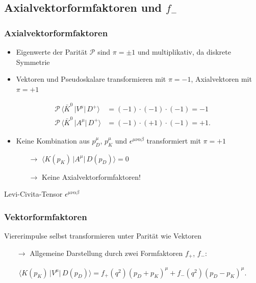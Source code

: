 \documentclass[hyperref={pdfpagelabels=false}]{beamer}
\begin{document}
\subsection{Axialvektorformfaktoren und $f_-$}
\begin{frame}
\frametitle{Axialvektorformfaktoren}
\begin{itemize}
 \item Eigenwerte der Parität $\mathcal{P}$ sind $\pi = \pm1$ und multiplikativ, da diskrete Symmetrie
 \item Vektoren und Pseudoskalare transformieren mit $\pi = -1$, Axialvektoren mit $\pi = +1$
\end{itemize}
\begin{align}
 \mathcal{P} \, \big\langle\bar K^0\,\big|V^\mu|\,D^+\big\rangle &= (-1)\cdot(-1)\cdot(-1) = -1 \nonumber \\
 \mathcal{P} \, \big\langle\bar K^0\,\big|A^\mu|\,D^+\big\rangle &= (-1)\cdot(+1)\cdot(-1) = +1. \nonumber
\end{align}
\begin{itemize}
 \item Keine Kombination aus $p_D^\mu$, $p_K^\mu$ und $\epsilon^{\mu\nu\alpha\beta}$ transformiert mit $\pi = +1$
 \begin{itemize}
  \item [$\rightarrow$] $\big\langle K(p_K)\,\big|A^\mu\big|\, D(p_D)\big\rangle = 0$
  \item [$\rightarrow$] Keine Axialvektorformfaktoren!
 \end{itemize}
\end{itemize}
\vspace{0.7cm}
\small{Levi-Civita-Tensor $\epsilon^{\mu\nu\alpha\beta}$}

\end{frame}

\begin{frame}
 \frametitle{Vektorformfaktoren}
Viererimpulse selbst transformieren unter Parität wie Vektoren
  \begin{itemize}
   \item [$\rightarrow$] Allgemeine Darstellung durch zwei Formfaktoren $f_+$, $f_-$:
  \end{itemize}

\begin{align*}
 \big\langle K(p_K)\,\big|V^\mu\big|\, D(p_D)\big\rangle = f_+(q^2)(p_D+p_K)^\mu + f_-(q^2)(p_D-p_K)^\mu.
\end{align*}
\end{frame}
\end{document}
